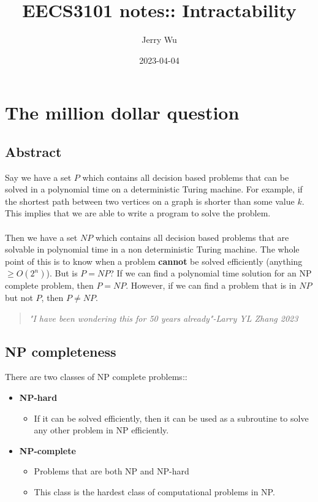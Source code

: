 \documentclass[12pt]{book}
\title{EECS3101 notes:: Intractability}
\author{Jerry Wu}
\date{2023-04-04}
\begin{document}
\maketitle

\chapter*{The million dollar question}
\section*{Abstract}
Say we have a set $P$ which contains all decision based problems that can be solved in a polynomial time on a deterministic Turing machine. For example, if the shortest path between two vertices on a graph is shorter than some value $k$. This implies that we are able to write a program to solve the problem.\\ \\Then we have a set $NP$ which contains all decision based problems that are solvable in polynomial time in a non deterministic Turing machine. The whole point of this is to know when a problem \textbf{cannot} be solved efficiently (anything $\geq O(2^n)$). But is $P=NP$? If we can find a polynomial time solution for an NP complete problem, then $P=NP$. However, if we can find a problem that is in $NP$ but not $P$, then $P\neq NP$.

\begin{quote}
    \textit{"I have been wondering this for 50 years already"-Larry YL Zhang 2023}
\end{quote}

\section*{NP completeness}

There are two classes of NP complete problems::

\begin{itemize}
    \item \textbf{NP-hard}
    \begin{itemize}
        \item If it can be solved efficiently, then it can be used as a subroutine to solve any other problem in NP efficiently.
    \end{itemize} 

    \item \textbf{NP-complete}
    \begin{itemize}
        \item Problems that are both NP and NP-hard
        \item This class is the hardest class of computational problems in NP.
    \end{itemize} 
\end{itemize}
\end{document}
